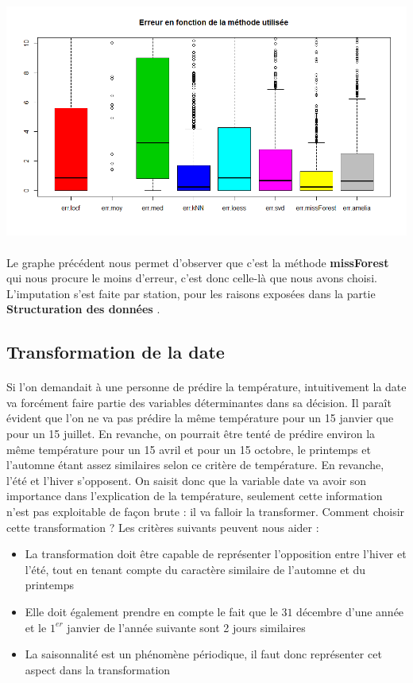 \documentclass[14pt, openany]{article}
\begin{document}
\includegraphics[width=17cm]{Images/err_imp.png}
\begin{center}
\label{fig1}
\end{center}
\paragraph{}
Le graphe précédent nous permet d'observer que c'est la méthode \textbf{missForest} qui nous procure le moins d'erreur, c'est donc celle-là que nous avons choisi. L'imputation s'est faite par station, pour les raisons exposées dans la partie \og \textbf{Structuration des données} \fg{}.
\newpage 
\subsection{Transformation de la date}
\paragraph{}
Si l'on demandait à une personne de prédire la température, intuitivement la date va forcément faire partie des variables déterminantes dans sa décision. Il paraît évident que l'on ne va pas prédire la même température pour un 15 janvier que pour un 15 juillet. En revanche, on pourrait être tenté de prédire environ la même température pour un 15 avril et pour un 15 octobre, le printemps et l'automne étant assez similaires selon ce critère de température. En revanche, l'été et l'hiver s'opposent. On saisit donc que la variable date va avoir son importance dans l'explication de la température, seulement cette information n'est pas exploitable de façon brute : il va falloir la transformer. Comment choisir cette transformation ? Les critères suivants peuvent nous aider :
\begin{itemize}
\item La transformation doit être capable de représenter l'opposition entre l'hiver et l'été, tout en tenant compte du caractère similaire de l'automne et du printemps
\item Elle doit également prendre en compte le fait que le $31$ décembre d'une année et le $1^{er}$ janvier de l'année suivante sont 2 jours similaires
\item La saisonnalité est un phénomène périodique, il faut donc représenter cet aspect dans la transformation
\end{itemize}
\end{document}
